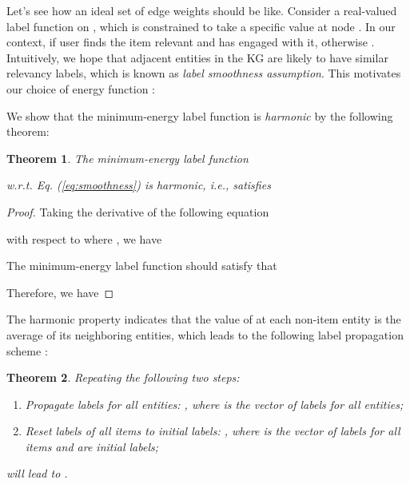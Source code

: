 \documentclass[sigconf]{acmart}
\newtheorem{theorem}{Theorem}
\begin{document}
		Let's see how an ideal set of edge weights should be like.
		Consider a real-valued label function  on , which is constrained to take a specific value  at node .
		In our context,  if user  finds the item  relevant and has engaged with it, otherwise .
		Intuitively, we hope that adjacent entities in the KG are likely to have similar relevancy labels, which is known as \textit{label smoothness assumption}.
		This motivates our choice of energy function :
		
		We show that the minimum-energy label function is \textit{harmonic} by the following theorem:
		
		\begin{theorem}
		\label{thm:1}
			The minimum-energy label function
			
			w.r.t. Eq. (\ref{eq:smoothness}) is harmonic, i.e.,  satisfies
			
		\end{theorem}
		
		\begin{proof}
			Taking the derivative of the following equation
			
			with respect to  where , we have
			
			
			The minimum-energy label function  should satisfy that
			
			Therefore, we have
			
		\end{proof}
		
		The harmonic property indicates that the value of  at each non-item entity  is the average of its neighboring entities, which leads to the following label propagation scheme \cite{zhu2005semi}:
		
		\begin{theorem}
		\label{thm:2}
			Repeating the following two steps:
			\begin{enumerate}
				\item Propagate labels for all entities: , where  is the vector of labels for all entities;
				\item Reset labels of all items to initial labels: , where  is the vector of labels for all items and  are initial labels;
			\end{enumerate}
			will lead to .
		\end{theorem}
		
\end{document}
